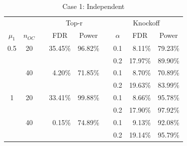 \documentclass[]{interact}
\theoremstyle{plain}%
\theoremstyle{definition}
\theoremstyle{remark}
\begin{document}
\begin{table}[htbp]
  \centering
  \caption{Case 1: Independent}
    \begin{tabular}{ccrrrrrrr}
    \toprule
      &   &   & \multicolumn{2}{c}{Top-r} &   & \multicolumn{3}{c}{Knockoff} \\
\cmidrule{4-5}\cmidrule{7-9}    \multicolumn{1}{c}{$\mu_1$} & \multicolumn{1}{c}{$n_{OC}$} &   & \multicolumn{1}{c}{FDR} & \multicolumn{1}{c}{Power} &   & \multicolumn{1}{c}{$\alpha$} & \multicolumn{1}{c}{FDR} & \multicolumn{1}{c}{Power} \\
    \midrule
    0.5 & 20 &   & 35.45\% & 96.82\% &   & 0.1 & 8.11\% & 79.23\% \\
      &   &   &   &   &   & 0.2 & 17.97\% & 89.90\% \\
      & 40 &   & 4.20\% & 71.85\% &   & 0.1 & 8.70\% & 70.89\% \\
      &   &   &   &   &   & 0.2 & 19.63\% & 83.99\% \\
    1 & 20 &   & 33.41\% & 99.88\% &   & 0.1 & 8.66\% & 95.78\% \\
      &   &   &   &   &   & 0.2 & 17.90\% & 97.92\% \\
      & 40 &   & 0.15\% & 74.89\% &   & 0.1 & 9.13\% & 92.08\% \\
      &   &   &   &   &   & 0.2 & 19.14\% & 95.79\% \\
      \bottomrule
    \end{tabular}%
  \label{tab:addlabel}%
\end{table}%
\end{document}
